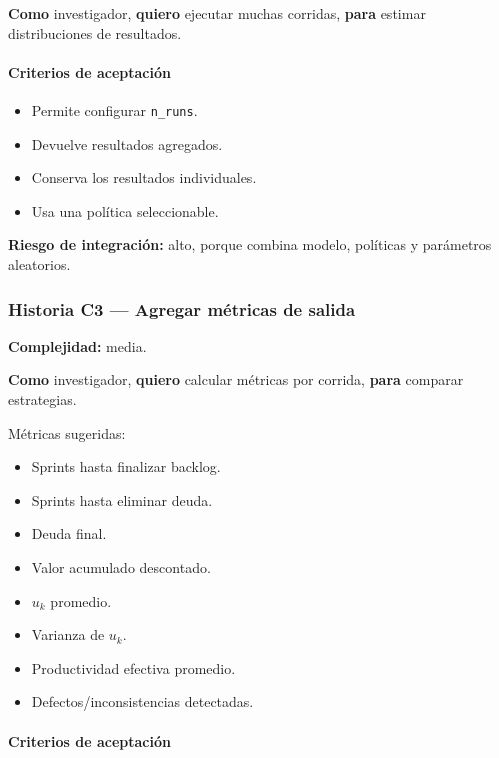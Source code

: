 \documentclass[11pt,a4paper]{article}
\begin{document}
\textbf{Como} investigador, \textbf{quiero} ejecutar muchas corridas, \textbf{para} estimar distribuciones de resultados.

\paragraph{Criterios de aceptaci\'on}

\begin{itemize}[leftmargin=*]
    \item Permite configurar \texttt{n\_runs}.
    \item Devuelve resultados agregados.
    \item Conserva los resultados individuales.
    \item Usa una pol\'itica seleccionable.
\end{itemize}

\textbf{Riesgo de integraci\'on:} alto, porque combina modelo, pol\'iticas y par\'ametros aleatorios.

\subsubsection{Historia C3 --- Agregar m\'etricas de salida}

\textbf{Complejidad:} media.

\textbf{Como} investigador, \textbf{quiero} calcular m\'etricas por corrida, \textbf{para} comparar estrategias.

M\'etricas sugeridas:

\begin{itemize}[leftmargin=*]
    \item Sprints hasta finalizar backlog.
    \item Sprints hasta eliminar deuda.
    \item Deuda final.
    \item Valor acumulado descontado.
    \item $u_k$ promedio.
    \item Varianza de $u_k$.
    \item Productividad efectiva promedio.
    \item Defectos/inconsistencias detectadas.
\end{itemize}

\paragraph{Criterios de aceptaci\'on}
\end{document}
